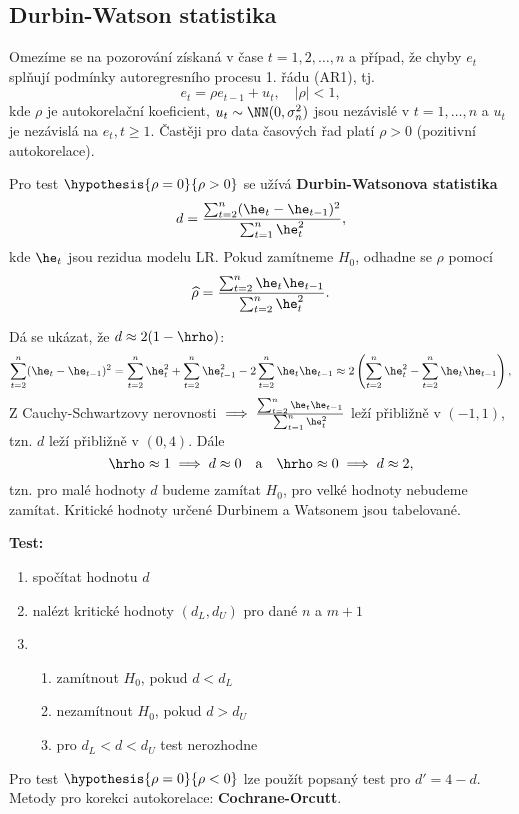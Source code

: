 \subsection{Durbin-Watson statistika}
Omezíme se na pozorování získaná v čase $t = 1,2,\dots, n$ a případ, že chyby $e_t$ splňují podmínky autoregresního procesu 1. řádu (AR1), tj.
$$
e_t = \rho e_{t-1}+ u_t, \quad |\rho| < 1,
$$
kde $\rho$ je autokorelační koeficient, $u_t \sim \NN (0, \sigma_n^2)$ jsou nezávislé v $t = 1,\dots, n$ a $u_t$ je nezávislá na $e_t, t \geq 1$. Častěji pro data časových řad platí $\rho > 0$ (pozitivní autokorelace).

Pro test $\hypothesis{\rho = 0}{\rho > 0}$ se užívá \textbf{Durbin-Watsonova statistika}
$$
d = \frac{\sum_{t=2}^n(\he_t - \he_{t-1})^2}{\sum_{t=1}^n \he_t^2},
$$
kde $\he_t$ jsou rezidua modelu LR. Pokud zamítneme $H_0$, odhadne se $\rho$ pomocí
$$
\widehat{\rho} = \frac{\sum_{t=2}^n \he_t \he_{t-1}}{\sum_{t=2}^n \he_t^2}.
$$

\newcommand{\sumtn}{\sum_{t=2}^{n}}
\begin{remark}
Dá se ukázat, že $d \approx 2(1-\hrho)$:
$$
\sum_{t=2}^n(\he_t - \he_{t-1})^2 = \sumtn \he_t^2 + \sumtn \he_{t-1}^2 - 2 \sumtn \he_t \he_{t-1} \approx 2 \left( \sumtn \he_t^2 - \sumtn \he_t \he_{t-1} \right),
$$
Z Cauchy-Schwartzovy nerovnosti $\implies \frac{\sumtn \he_t \he_{t-1}}{\sum_{t=1}^n \he_t^2}$ leží přibližně v $(-1,1)$, tzn. $d$ leží přibližně v $(0,4)$. Dále
$$
\hrho \approx 1 \implies d \approx 0 \quad \text{a} \quad \hrho \approx 0 \implies d \approx 2,
$$
tzn. pro malé hodnoty $d$ budeme zamítat $H_0$, pro velké hodnoty nebudeme zamítat. Kritické hodnoty určené Durbinem a Watsonem jsou tabelované.
\end{remark}

\noindent \textbf{Test:}
\begin{enumerate}
	\item spočítat hodnotu $d$
	\item nalézt kritické hodnoty $(d_L,d_U)$ pro dané $n$ a $m+1$
	\item \begin{enumerate}
		\item zamítnout $H_0$, pokud $d < d_L$
		\item nezamítnout $H_0$, pokud $d > d_U$
		\item pro $d_L < d < d_U$ test nerozhodne
	\end{enumerate}
\end{enumerate}

\begin{remark}
	Pro test $\hypothesis{\rho = 0}{\rho < 0}$ lze použít popsaný test pro $d' = 4 - d$. Metody pro korekci autokorelace: \textbf{Cochrane-Orcutt}.
\end{remark}